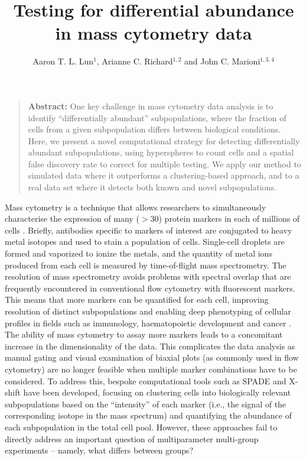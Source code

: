 \documentclass{article}
\title{Testing for differential abundance in mass cytometry data}
\author{Aaron T. L. Lun$^{1}$, Arianne C. Richard$^{1,2}$ and John C. Marioni$^{1,3,4}$}
\date{
\begin{minipage}{0.9\textwidth}
\begin{flushleft} 
\begin{small}
$^1$Cancer Research UK Cambridge Institute, University of Cambridge, Li Ka Shing Centre, Robinson Way, Cambridge CB2 0RE, United Kingdom \\
$^2$Cambridge Institute for Medical Research,  University of Cambridge, Wellcome Trust/MRC Building, Hills Road, Cambridge CB2 0XY, United Kingdom \\
$^3$EMBL European Bioinformatics Institute, Wellcome Genome Campus, Hinxton, Cambridge CB10 1SD, United Kingdom \\
$^4$Wellcome Trust Sanger Institute, Wellcome Genome Campus, Hinxton, Cambridge CB10 1SA, United Kingdom \\
\end{small}
\end{flushleft}
\end{minipage}\\[0.2in]
\today{}
}
\begin{document}
\maketitle

\begin{quote}
\textbf{Abstract:} 
One key challenge in mass cytometry data analysis is to identify ``differentially abundant'' subpopulations, where the fraction of cells from a given subpopulation differs between biological conditions. 
Here, we present a novel computational strategy for detecting differentially abundant subpopulations, using hyperspheres to count cells and a spatial false discovery rate to correct for multiple testing.
We apply our method to simulated data where it outperforms a clustering-based approach, and to a real data set where it detects both known and novel subpopulations.
\end{quote}

\noindent
Mass cytometry is a technique that allows researchers to simultaneously characterise the expression of many ($>30$) protein markers in each of millions of cells \cite{ornatsky2008study}.
Briefly, antibodies specific to markers of interest are conjugated to heavy metal isotopes and used to stain a population of cells.
Single-cell droplets are formed and vaporized to ionize the metals, and the quantity of metal ions produced from each cell is measured by time-of-flight mass spectrometry.
The resolution of mass spectrometry avoids problems with spectral overlap that are frequently encountered in conventional flow cytometry with fluorescent markers.
This means that more markers can be quantified for each cell, improving resolution of distinct subpopulations and enabling deep phenotyping of cellular profiles in fields such as immunology, haematopoietic development and cancer \cite{leipold2015multiparameter,leelatian2015characterizing,hansmann2015mass,bendall2011singlecell,levine2015datadriven}.
The ability of mass cytometry to assay more markers leads to a concomitant increase in the dimensionality of the data.
This complicates the data analysis as manual gating and visual examination of biaxial plots (as commonly used in flow cytometry) are no longer feasible when multiple marker combinations have to be considered.
To address this, bespoke computational tools such as SPADE \cite{qiu2011extracting} and X-shift \cite{samusik2016automated} have been developed, focusing on clustering cells into biologically relevant subpopulations based on the ``intensity'' of each marker (i.e., the signal of the corresponding isotope in the mass spectrum) and quantifying the abundance of each subpopulation in the total cell pool.
However, these approaches fail to directly address an important question of multiparameter multi-group experiments -- namely, what differs between groups?
\end{document}
